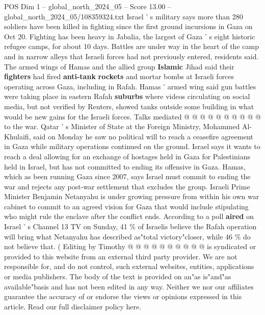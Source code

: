 \begin{textsample}{POS Dim 1 – global\_north\_2024\_05 – Score 13.00 – global\_north\_2024\_05/108359324.txt}
Israel ' s military says more than 280 soldiers have been killed in fighting since the first ground incursions in Gaza on Oct 20.
Fighting has been heavy in Jabalia, the largest of Gaza ' s eight historic refugee camps, for about 10 days.
Battles are under way in the heart of the camp and in narrow alleys that Israeli forces had not previously entered, residents said.
The armed wings of Hamas and the allied group \textbf{Islamic} Jihad said their \textbf{fighters} had fired \textbf{anti-tank} \textbf{rockets} and mortar bombs at Israeli forces operating across Gaza, including in Rafah.
Hamas ' armed wing said gun battles were taking place in eastern Rafah \textbf{suburbs} where videos circulating on social media, but not verified by Reuters, showed tanks outside some building in what would be new gains for the Israeli forces.
Talks mediated @ @ @ @ @ @ @ @ @ @ to the war.
Qatar ' s Minister of State at the Foreign Ministry, Mohammed Al-Khulaifi, said on Monday he saw no political will to reach a ceasefire agreement in Gaza while military operations continued on the ground.
Israel says it wants to reach a deal allowing for an exchange of hostages held in Gaza for Palestinians held in Israel, but has not committed to ending its offensive in Gaza.
Hamas, which as been running Gaza since 2007, says Israel must commit to ending the war and rejects any post-war settlement that excludes the group.
Israeli Prime Minister Benjamin Netanyahu is under growing pressure from within his own war cabinet to commit to an agreed vision for Gaza that would include stipulating who might rule the enclave after the conflict ends.
According to a poll \textbf{aired} on Israel ' s Channel 13 TV on Sunday, 41 \% of Israelis believe the Rafah operation will bring what Netanyahu has described as"total victory"closer, while 46 \% do not believe that. ( Editing by Timothy @ @ @ @ @ @ @ @ @ @ is syndicated or provided to this website from an external third party provider.
We are not responsible for, and do not control, such external websites, entities, applications or media publishers.
The body of the text is provided on an"as is"and"as available"basis and has not been edited in any way.
Neither we nor our affiliates guarantee the accuracy of or endorse the views or opinions expressed in this article.
Read our full disclaimer policy here.

\end{textsample}
